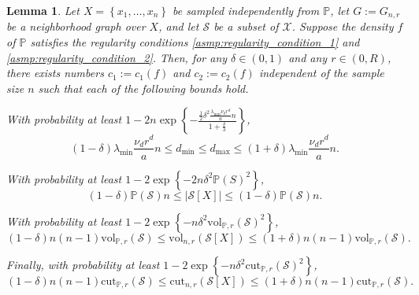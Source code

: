 \documentclass[11pt,twoside]{article}
\newtheorem{lemma}{Lemma}
\newcommand{\set}[1]{\left\{#1\right\}}
\newcommand{\vol}{\mathrm{vol}}
\newcommand{\cut}{\mathrm{cut}}
\newcommand{\abs}[1]{\left \lvert #1 \right \rvert}
\newcommand{\1}{\mathbf{1}}
\newcommand{\Pbb}{\mathbb{P}}
\begin{document}
\begin{lemma}
	\label{lem:graph_functional_concentration}
	Let $X = \set{x_1,\ldots,x_n}$ be sampled independently from $\Pbb$, let $G := G_{n,r}$ be a neighborhood graph over $X$, and let $\mathcal{S}$ be a subset of $\mathcal{X}$. Suppose the density $f$ of $\Pbb$ satisfies the regularity conditions \ref{asmp:regularity_condition_1} and \ref{asmp:regularity_condition_2}. Then, for any $\delta \in (0,1)$ and any $r \in (0,R)$, there exists numbers $c_1 := c_1(f)$ and $c_2 := c_2(f)$ independent of the sample size $n$ such that each of the following bounds hold.
	
	With probability at least $1 - 2n\exp\set{-\frac{\frac{1}{2}\delta^2 \frac{\lambda_{\min} \nu_d r^d}{a}n}{1 + \frac{\delta}{3}}}$,
	\begin{equation*}
	(1 - \delta) \lambda_{\min} \frac{\nu_dr^d}{a} n \leq d_{\min} \leq d_{\max} \leq (1 + \delta) \lambda_{\min} \frac{\nu_dr^d}{a}n.
	\end{equation*}
	
	With probability at least $1 - 2\exp\set{-2n\delta^2\Pbb(S)^2}$,
	\begin{equation*}
	(1 - \delta) \mathbb{P}(\mathcal{S}) n \leq \abs{\mathcal{S}[X]} \leq (1 - \delta) \mathbb{P}(\mathcal{S}) n.
	\end{equation*}
	
	With probability at least $1 - 2\exp\set{-n\delta^2\vol_{\Pbb,r}(\mathcal{S})^2}$,
	\begin{equation*}
	(1 - \delta) n (n - 1) \vol_{\Pbb,r}(\mathcal{S}) \leq \vol_{n,r}(\mathcal{S}[X]) \leq (1 + \delta) n (n - 1) \vol_{\Pbb,r}(\mathcal{S}).
	\end{equation*}
	
	Finally, with probability at least $1 - 2\exp\set{-n\delta^2\cut_{\Pbb,r}(\mathcal{S})^2}$,
	\begin{equation*}
	(1 - \delta) n (n - 1) \cut_{\Pbb,r}(\mathcal{S}) \leq \cut_{n,r}(\mathcal{S}[X]) \leq (1 + \delta) n (n - 1) \cut_{\Pbb,r}(\mathcal{S}).
	\end{equation*}	
\end{lemma}
\end{document}

